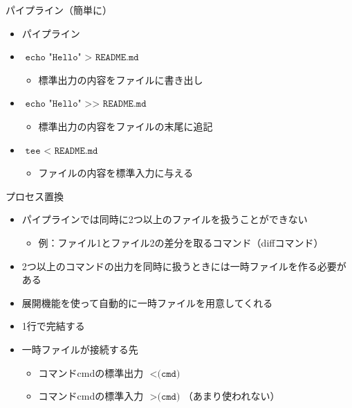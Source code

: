 \documentclass[12pt,aspectratio=169]{beamer}
\begin{document}
\begin{frame}{パイプライン（簡単に）}

  \begin{itemize}
    \item パイプライン
    \vspace{0.5cm}
    \item $ \texttt { echo "Hello" > README.md } $
      \begin{itemize}
        \item 標準出力の内容をファイルに書き出し
      \end{itemize}
    \item $ \texttt { echo "Hello" >> README.md } $
      \begin{itemize}
        \item 標準出力の内容をファイルの末尾に追記
      \end{itemize}
    \item $ \texttt { tee < README.md } $
      \begin{itemize}
        \item ファイルの内容を標準入力に与える
      \end{itemize}

  \end{itemize}

\end{frame}

\begin{frame}{プロセス置換}

  \begin{itemize}
    \item パイプラインでは同時に2つ以上のファイルを扱うことができない
    \begin{itemize}
      \item 例：ファイル1とファイル2の差分を取るコマンド（diffコマンド）
    \end{itemize}
    \item 2つ以上のコマンドの出力を同時に扱うときには一時ファイルを作る必要がある
    \item 展開機能を使って自動的に一時ファイルを用意してくれる
    \item 1行で完結する
    \item 一時ファイルが接続する先
      \begin{itemize}
        \item コマンドcmdの標準出力 $ \texttt { <(cmd) } $
        \item コマンドcmdの標準入力 $ \texttt { >(cmd) } $（あまり使われない）
      \end{itemize}
  \end{itemize}

\end{frame}
\end{document}
